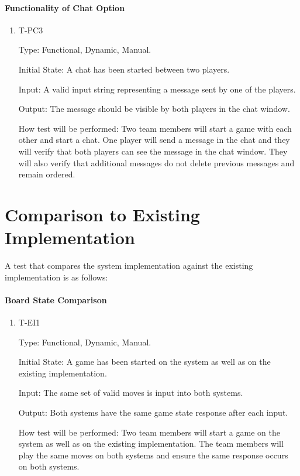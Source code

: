 \documentclass[12pt, titlepage]{article}
\begin{document}
    \paragraph{Functionality of Chat Option}
    
        \begin{enumerate}
        
            \item{T-PC3\\}
            
                Type: Functional, Dynamic, Manual.
                					
                Initial State: A chat has been started between two players.
                					
                Input: A valid input string representing a message sent by one of the players.
                					
                Output: The message should be visible by both players in the chat window.
                					
                How test will be performed: Two team members will start a game with each other and start a chat. One player will send a message in the chat and they will verify that both players can see the message in the chat window. They will also verify that additional messages do not delete previous messages and remain ordered.
				
        \end{enumerate}

	
\section{Comparison to Existing Implementation}	

A test that compares the system implementation against the existing implementation is as follows:

\paragraph{Board State Comparison}
    
    \begin{enumerate}
    
        \item{T-EI1\\}
        
            Type: Functional, Dynamic, Manual.
            					
            Initial State: A game has been started on the system as well as on the existing implementation.
            					
            Input: The same set of valid moves is input into both systems.
            					
            Output: Both systems have the same game state response after each input.
            					
            How test will be performed: Two team members will start a game on the system as well as on the existing implementation. The team members will play the same moves on both systems and ensure the same response occurs on both systems.
			
    \end{enumerate}
\end{document}
